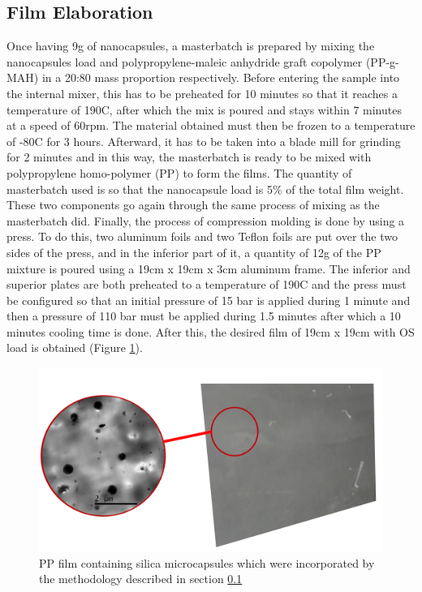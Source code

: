 \begin{refsection}
\subsection{Film Elaboration} \label{sec:film_elaboration}
Once having 9g of nanocapsules, a masterbatch is prepared by mixing the nanocapsules load and polypropylene-maleic anhydride graft copolymer (PP-g-MAH) in a  20:80 mass proportion respectively. Before entering the sample into the internal mixer, this has to be preheated for 10 minutes so that it reaches a temperature of 190\degree C, after which the mix is poured and stays within 7 minutes at a speed of 60rpm. The material obtained must then be frozen to a temperature of -80\degree C for 3 hours. Afterward, it has to be taken into a blade mill for grinding for 2 minutes and in this way, the masterbatch is ready to be mixed with polypropylene homo-polymer (PP) to form the films. The quantity of masterbatch used is so that the nanocapsule load is 5\% of the total film weight. These two components go again through the same process of mixing as the masterbatch did. Finally, the process of compression molding is done by using a press. To do this, two aluminum foils and two Teflon foils are put over the two sides of the press, and in the inferior part of it, a quantity of 12g of the PP mixture is poured using a 19cm x 19cm x 3cm aluminum frame. The inferior and superior plates are both preheated to a temperature of 190\degree C and the press must be configured so that an initial pressure of 15 bar is applied during 1 minute and then a pressure of 110 bar must be applied during 1.5 minutes after which a 10 minutes cooling time is done. After this, the desired film of 19cm x 19cm with OS load is obtained (Figure \ref{fig:film}).

\begin{figure}[ht]
    \centering
    \includegraphics[width=0.6\linewidth]{Documento_Latex/Imagenes/pelicula.png}
    \caption{PP film containing silica microcapsules which were incorporated by the methodology described in section \ref{sec:film_elaboration} \cite{ArellanoAyala2019EfectosAntioxidantes}}
    \label{fig:film}
\end{figure}


\end{refsection}
